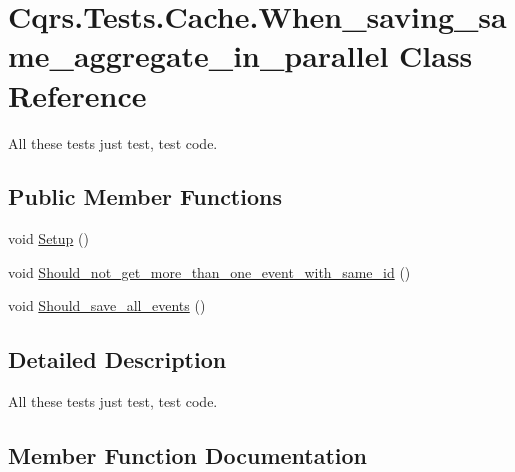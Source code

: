 \hypertarget{classCqrs_1_1Tests_1_1Cache_1_1When__saving__same__aggregate__in__parallel}{}\section{Cqrs.\+Tests.\+Cache.\+When\+\_\+saving\+\_\+same\+\_\+aggregate\+\_\+in\+\_\+parallel Class Reference}
\label{classCqrs_1_1Tests_1_1Cache_1_1When__saving__same__aggregate__in__parallel}


All these tests just test, test code.  


\subsection*{Public Member Functions}
\begin{DoxyCompactItemize}
\item 
void \hyperlink{classCqrs_1_1Tests_1_1Cache_1_1When__saving__same__aggregate__in__parallel_a890f63553517f7e3ad0c848f191adaed}{Setup} ()
\item 
void \hyperlink{classCqrs_1_1Tests_1_1Cache_1_1When__saving__same__aggregate__in__parallel_a27a82cf373e64f46b3e8bb1fb065d2a1}{Should\+\_\+not\+\_\+get\+\_\+more\+\_\+than\+\_\+one\+\_\+event\+\_\+with\+\_\+same\+\_\+id} ()
\item 
void \hyperlink{classCqrs_1_1Tests_1_1Cache_1_1When__saving__same__aggregate__in__parallel_afcef550c102b327fdbd4d2a3f73786aa}{Should\+\_\+save\+\_\+all\+\_\+events} ()
\end{DoxyCompactItemize}


\subsection{Detailed Description}
All these tests just test, test code. 



\subsection{Member Function Documentation}
\mbox{\label{classCqrs_1_1Tests_1_1Cache_1_1When__saving__same__aggregate__in__parallel_a890f63553517f7e3ad0c848f191adaed}} 
